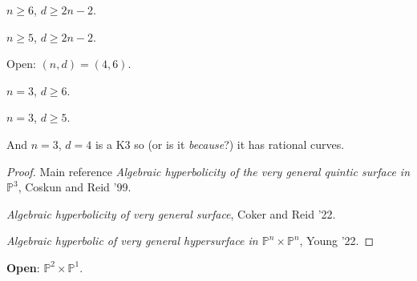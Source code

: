 \begin{theorem}
\label{theorem-mioranci-3}
$n\geq 6$, $d \geq  2n-2$.
\end{theorem}

\begin{theorem}[Yeong '22]
\label{theorem-mioranci-4}
$n\geq 5$, $d\geq 2n-2$.
\end{theorem}

Open: $(n,d)=(4,6)$.

\medskip{}

\begin{theorem}[Xu, '94]
\label{theorem-mioranci-5}
$n=3$, $d \geq  6$.
\end{theorem}

\begin{theorem}
\label{theorem-mioranci-6}
$n=3$, $d \geq 5$.
\end{theorem}

And $n=3$, $d=4$ is a  K3 so (or is it
\textit{because}?)  it has rational curves.

\medskip{}

\begin{proof}
Main reference  \textit{Algebraic
hyperbolicity of the very general quintic
surface in $\mathbb{P}^3$}, Coskun and Reid
'99.

\textit{Algebraic hyperbolicity of very
general surface}, Coker and Reid '22.

\textit{Algebraic hyperbolic of very general
hypersurface in
$\mathbb{P}^n\times\mathbb{P}^n$}, Young '22.
\end{proof}

\textbf{Open}: $\mathbb{P}^2 \times
\mathbb{P}^1$.

